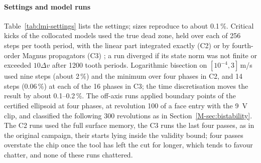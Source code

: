 \paragraph{Settings and model runs}
Table~\ref{tab:lmi-settings} lists the settings; sizes reproduce to about 0.1\,\%. Critical kicks of the collocated models used the true dead zone, held over each of 256 steps per tooth period, with the linear part integrated exactly (C2) or by fourth-order Magnus propagators (C3) \citep{blanes2009magnus}; a run diverged if its state norm was not finite or exceeded $10\Delta v$ after 1200 tooth periods. Logarithmic bisection on $[10^{-4},3]$\,m/s used nine steps (about 2\,\%) and the minimum over four phases in C2, and 14 steps (0.06\,\%) at each of the 16 phases in C3; the time discretisation moves the result by about 0.1--0.2\,\%. The off-axis runs applied boundary points of the certified ellipsoid at four phases, at revolution 100 of a face entry with the \SI{9}{\volt} clip, and classified the following 300 revolutions as in Section~\ref{M-sec:bistability}. The C2 runs used the full surface memory, the C3 runs the last four passes, as in the original campaign, their starts lying inside the validity bound; four passes overstate the chip once the tool has left the cut for longer, which tends to favour chatter, and none of these runs chattered.
